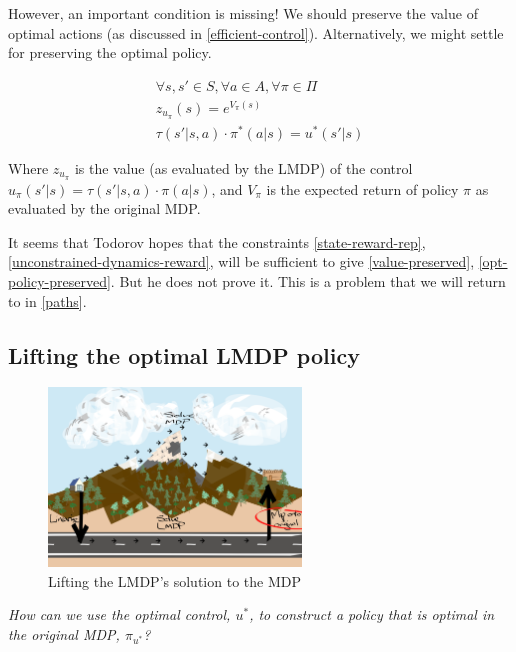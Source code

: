 However, an important condition is missing!
We should preserve the value of optimal actions (as discussed in \ref{efficient-control}).
Alternatively, we might settle for preserving the optimal policy.

\begin{align*}
\forall s, s' \in S, \forall a \in A, \forall \pi \in \Pi \\
z_{u_{\pi}}(s) = e^{V_{\pi}(s)} \label{value-preserved}\tag{value} \\
\tau(s'|s, a) \cdot \pi^{* }(a|s) = u^{* }(s'|s) \label{opt-policy-preserved}\tag{optimal policy}
\end{align*}

Where $z_{u_{\pi}}$ is the value (as evaluated by the LMDP) of the control $u_{\pi}(s'|s) = \tau(s'|s, a) \cdot \pi(a|s)$, and $V_{\pi}$ is the expected return of policy $\pi$ as evaluated by the original MDP.

It seems that Todorov hopes that the constraints \ref{state-reward-rep}, \ref{unconstrained-dynamics-reward},
will be sufficient to give \ref{value-preserved}, \ref{opt-policy-preserved}. But he does not prove it.
This is a problem that we will return to in \ref{paths}.

\subsection{Lifting the optimal LMDP policy}\label{lift-mdp}

\begin{figure}[h!]
\centering
\includegraphics[width=0.6\textwidth,height=0.3\textheight]{../../pictures/drawings/abstract-representations-project.png}
\caption{Lifting the LMDP's solution to the MDP}
\end{figure}

\begin{displayquote}
\textsl{How can we use the optimal control, $u^{* }$, to construct a policy that is optimal in the original MDP, $\pi_{u^* }$?}
\end{displayquote}

